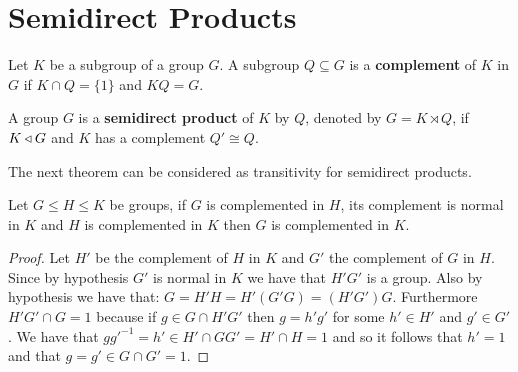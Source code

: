 \section{Semidirect Products}

\begin{definition}
    Let $K$ be a subgroup of a group $G$. A subgroup $Q \subseteq G$ is a \textbf{complement} of $K$ in $G$ if $K \cap Q = \{1\}$ and $KQ = G$.
\end{definition}

\begin{definition}
    A group $G$ is a \textbf{semidirect product} of $K$ by $Q$, denoted by $G = K \rtimes Q$, if $K \triangleleft G$ and $K$ has a complement $Q' \cong Q$.

\end{definition}

The next theorem can be considered as transitivity for semidirect products.

\begin{theorem}
\label{smdptrans}
Let $G \le H \le K$ be groups, if $G$ is complemented in $H$, its complement is normal in $K$ and $H$ is complemented in $K$ then $G$ is complemented in $K$.
\end{theorem}

\begin{proof}
    Let $H'$ be the complement of $H$ in $K$ and $G'$ the complement of $G$ in $H$. Since by hypothesis $G'$ is normal in $K$ we have that $H'G'$ is a group. Also by hypothesis we have that:
    $G = H'H =H'(G'G) = (H'G')G$.
    Furthermore $H'G' \cap G = 1$ because if $g \in G \cap H'G'$ then $g = h'g'$ for some $h' \in H'$ and $g' \in G'$. We have that $gg'^{-1} = h' \in H' \cap GG' = H' \cap H = 1$ and so it follows that $h' = 1$ and that $g = g' \in G \cap G' = 1$.
\end{proof}